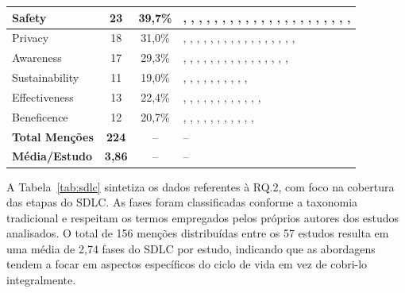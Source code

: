\begin{table}[htbp]
\begin{tabular}{lccp{6.5cm}}
\hline
Safety                         & 23 & 39,7\% & \cite{S001}, \cite{S005}, \cite{S008}, \cite{S009}, \cite{S014}, \cite{S015}, \cite{S016}, \cite{S023}, \cite{S025}, \cite{S028}, \cite{S029}, \cite{S033}, \cite{S038}, \cite{S039}, \cite{S041}, \cite{S043}, \cite{S044}, \cite{S045}, \cite{S046}, \cite{S047}, \cite{S051}, \cite{S054}, \cite{S058} \\
\hline
Privacy                        & 18 & 31,0\% & \cite{S003}, \cite{S006}, \cite{S009}, \cite{S012}, \cite{S014}, \cite{S025}, \cite{S028}, \cite{S029}, \cite{S031}, \cite{S033}, \cite{S038}, \cite{S039}, \cite{S041}, \cite{S045}, \cite{S046}, \cite{S048}, \cite{S056}, \cite{S058} \\
\hline
Awareness                      & 17 & 29,3\% & \cite{S001}, \cite{S004}, \cite{S012}, \cite{S018}, \cite{S019}, \cite{S021}, \cite{S022}, \cite{S025}, \cite{S027}, \cite{S029}, \cite{S035}, \cite{S037}, \cite{S041}, \cite{S042}, \cite{S046}, \cite{S049}, \cite{S058} \\
\hline
Sustainability                 & 11 & 19,0\% & \cite{S005}, \cite{S023}, \cite{S025}, \cite{S026}, \cite{S028}, \cite{S030}, \cite{S033}, \cite{S038}, \cite{S040}, \cite{S046}, \cite{S051} \\
\hline
Effectiveness                  & 13 & 22,4\% & \cite{S005}, \cite{S008}, \cite{S015}, \cite{S018}, \cite{S022}, \cite{S024}, \cite{S026}, \cite{S034}, \cite{S035}, \cite{S036}, \cite{S045}, \cite{S046}, \cite{S055} \\
\hline
Beneficence                    & 12 & 20,7\% & \cite{S007}, \cite{S012}, \cite{S019}, \cite{S023}, \cite{S028}, \cite{S029}, \cite{S039}, \cite{S041}, \cite{S042}, \cite{S046}, \cite{S047}, \cite{S058} \\
\hline
\textbf{Total Menções} & \textbf{224} & -- & -- \\
\textbf{Média/Estudo} & \textbf{3,86} & -- & -- \\
\hline
\end{tabular}
\end{table}

A Tabela~\ref{tab:sdlc} sintetiza os dados referentes à RQ.2, com foco na cobertura das etapas do SDLC. As fases foram classificadas conforme a taxonomia tradicional e respeitam os termos empregados pelos próprios autores dos estudos analisados. O total de 156 menções distribuídas entre os 57 estudos resulta em uma média de 2,74 fases do SDLC por estudo, indicando que as abordagens tendem a focar em aspectos específicos do ciclo de vida em vez de cobri-lo integralmente.

